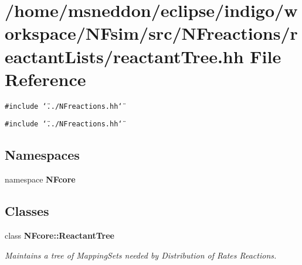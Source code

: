 \section{/home/msneddon/eclipse/indigo/workspace/NFsim/src/NFreactions/reactantLists/reactantTree.hh File Reference}
\label{reactantTree_8hh}


{\tt \#include \char`\"{}../NFreactions.hh\char`\"{}}\par
{\tt \#include \char`\"{}../NFreactions.hh\char`\"{}}\par
\subsection*{Namespaces}
\begin{CompactItemize}
\item 
namespace {\bf NFcore}
\end{CompactItemize}
\subsection*{Classes}
\begin{CompactItemize}
\item 
class {\bf NFcore::ReactantTree}
\begin{CompactList}\small\item\em Maintains a tree of MappingSets needed by Distribution of Rates Reactions. \item\end{CompactList}\end{CompactItemize}
